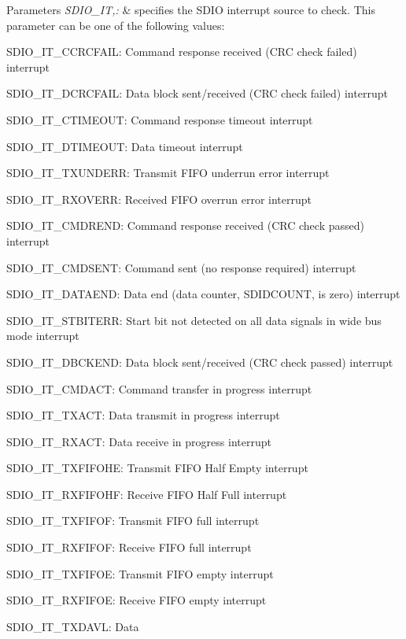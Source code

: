 \begin{DoxyParams}{Parameters}
{\em S\-D\-I\-O\-\_\-\-I\-T,\-:} & specifies the S\-D\-I\-O interrupt source to check. This parameter can be one of the following values\-: \begin{DoxyItemize}
\item S\-D\-I\-O\-\_\-\-I\-T\-\_\-\-C\-C\-R\-C\-F\-A\-I\-L\-: Command response received (C\-R\-C check failed) interrupt \item S\-D\-I\-O\-\_\-\-I\-T\-\_\-\-D\-C\-R\-C\-F\-A\-I\-L\-: Data block sent/received (C\-R\-C check failed) interrupt \item S\-D\-I\-O\-\_\-\-I\-T\-\_\-\-C\-T\-I\-M\-E\-O\-U\-T\-: Command response timeout interrupt \item S\-D\-I\-O\-\_\-\-I\-T\-\_\-\-D\-T\-I\-M\-E\-O\-U\-T\-: Data timeout interrupt \item S\-D\-I\-O\-\_\-\-I\-T\-\_\-\-T\-X\-U\-N\-D\-E\-R\-R\-: Transmit F\-I\-F\-O underrun error interrupt \item S\-D\-I\-O\-\_\-\-I\-T\-\_\-\-R\-X\-O\-V\-E\-R\-R\-: Received F\-I\-F\-O overrun error interrupt \item S\-D\-I\-O\-\_\-\-I\-T\-\_\-\-C\-M\-D\-R\-E\-N\-D\-: Command response received (C\-R\-C check passed) interrupt \item S\-D\-I\-O\-\_\-\-I\-T\-\_\-\-C\-M\-D\-S\-E\-N\-T\-: Command sent (no response required) interrupt \item S\-D\-I\-O\-\_\-\-I\-T\-\_\-\-D\-A\-T\-A\-E\-N\-D\-: Data end (data counter, S\-D\-I\-D\-C\-O\-U\-N\-T, is zero) interrupt \item S\-D\-I\-O\-\_\-\-I\-T\-\_\-\-S\-T\-B\-I\-T\-E\-R\-R\-: Start bit not detected on all data signals in wide bus mode interrupt \item S\-D\-I\-O\-\_\-\-I\-T\-\_\-\-D\-B\-C\-K\-E\-N\-D\-: Data block sent/received (C\-R\-C check passed) interrupt \item S\-D\-I\-O\-\_\-\-I\-T\-\_\-\-C\-M\-D\-A\-C\-T\-: Command transfer in progress interrupt \item S\-D\-I\-O\-\_\-\-I\-T\-\_\-\-T\-X\-A\-C\-T\-: Data transmit in progress interrupt \item S\-D\-I\-O\-\_\-\-I\-T\-\_\-\-R\-X\-A\-C\-T\-: Data receive in progress interrupt \item S\-D\-I\-O\-\_\-\-I\-T\-\_\-\-T\-X\-F\-I\-F\-O\-H\-E\-: Transmit F\-I\-F\-O Half Empty interrupt \item S\-D\-I\-O\-\_\-\-I\-T\-\_\-\-R\-X\-F\-I\-F\-O\-H\-F\-: Receive F\-I\-F\-O Half Full interrupt \item S\-D\-I\-O\-\_\-\-I\-T\-\_\-\-T\-X\-F\-I\-F\-O\-F\-: Transmit F\-I\-F\-O full interrupt \item S\-D\-I\-O\-\_\-\-I\-T\-\_\-\-R\-X\-F\-I\-F\-O\-F\-: Receive F\-I\-F\-O full interrupt \item S\-D\-I\-O\-\_\-\-I\-T\-\_\-\-T\-X\-F\-I\-F\-O\-E\-: Transmit F\-I\-F\-O empty interrupt \item S\-D\-I\-O\-\_\-\-I\-T\-\_\-\-R\-X\-F\-I\-F\-O\-E\-: Receive F\-I\-F\-O empty interrupt \item S\-D\-I\-O\-\_\-\-I\-T\-\_\-\-T\-X\-D\-A\-V\-L\-: Data 
\end{DoxyItemize}
\end{DoxyParams}
